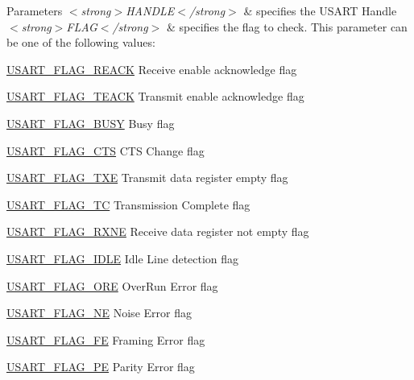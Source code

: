 \begin{DoxyParams}{Parameters}
{\em $<$strong$>$\+H\+A\+N\+D\+L\+E$<$/strong$>$} & specifies the U\+S\+A\+RT Handle \\
\hline
{\em $<$strong$>$\+F\+L\+A\+G$<$/strong$>$} & specifies the flag to check. This parameter can be one of the following values\+: \begin{DoxyItemize}
\item \hyperlink{group___u_s_a_r_t___flags_gafd437e5c2503128213cf38aed78bc9e6}{U\+S\+A\+R\+T\+\_\+\+F\+L\+A\+G\+\_\+\+R\+E\+A\+CK} Receive enable acknowledge flag \item \hyperlink{group___u_s_a_r_t___flags_gadf076898b631433dc47d6313cb2ecb1e}{U\+S\+A\+R\+T\+\_\+\+F\+L\+A\+G\+\_\+\+T\+E\+A\+CK} Transmit enable acknowledge flag \item \hyperlink{group___u_s_a_r_t___flags_gac21e6b7a6f6374c3c9a0b95341587920}{U\+S\+A\+R\+T\+\_\+\+F\+L\+A\+G\+\_\+\+B\+U\+SY} Busy flag \item \hyperlink{group___u_s_a_r_t___flags_ga94b7272319cca88a65075d5cb6048441}{U\+S\+A\+R\+T\+\_\+\+F\+L\+A\+G\+\_\+\+C\+TS} C\+TS Change flag \item \hyperlink{group___u_s_a_r_t___flags_ga7129f13333f2a7218838cc32fe507bfa}{U\+S\+A\+R\+T\+\_\+\+F\+L\+A\+G\+\_\+\+T\+XE} Transmit data register empty flag \item \hyperlink{group___u_s_a_r_t___flags_gae7b85c9e2cc86af5bbc8b8d8b854410f}{U\+S\+A\+R\+T\+\_\+\+F\+L\+A\+G\+\_\+\+TC} Transmission Complete flag \item \hyperlink{group___u_s_a_r_t___flags_ga11d6b70c8f00216b6d8a43790dfdcf2f}{U\+S\+A\+R\+T\+\_\+\+F\+L\+A\+G\+\_\+\+R\+X\+NE} Receive data register not empty flag \item \hyperlink{group___u_s_a_r_t___flags_gac2f1ccc91a834f9cbec3f058872b972a}{U\+S\+A\+R\+T\+\_\+\+F\+L\+A\+G\+\_\+\+I\+D\+LE} Idle Line detection flag \item \hyperlink{group___u_s_a_r_t___flags_gabdb285b5c1876d93f9c802f9304538d5}{U\+S\+A\+R\+T\+\_\+\+F\+L\+A\+G\+\_\+\+O\+RE} Over\+Run Error flag \item \hyperlink{group___u_s_a_r_t___flags_ga81781d27ffc8b85dfaf7b7b791229547}{U\+S\+A\+R\+T\+\_\+\+F\+L\+A\+G\+\_\+\+NE} Noise Error flag \item \hyperlink{group___u_s_a_r_t___flags_ga3551a32bac49a2ec040e5fdafcc9c4bd}{U\+S\+A\+R\+T\+\_\+\+F\+L\+A\+G\+\_\+\+FE} Framing Error flag \item \hyperlink{group___u_s_a_r_t___flags_ga5e87fde5704f27c75df25395e23404ad}{U\+S\+A\+R\+T\+\_\+\+F\+L\+A\+G\+\_\+\+PE} Parity Error flag \end{DoxyItemize}
\\
\hline
\end{DoxyParams}

